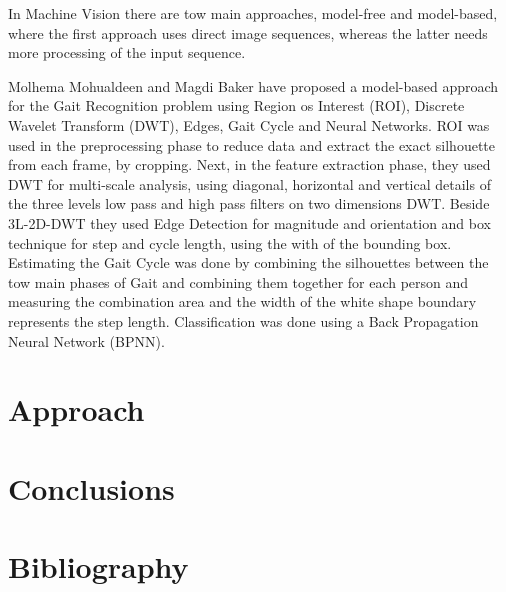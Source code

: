 \documentclass[12pt]{article}
\theoremstyle{definition}
\begin{document}
	In Machine Vision there are tow main approaches, model-free and model-based, where the first approach uses direct image sequences, whereas the latter needs more processing of the input sequence.
	
	Molhema Mohualdeen and Magdi Baker \cite{gait-silhouette-nn} have proposed a model-based approach for the Gait Recognition problem using Region os Interest (ROI), Discrete Wavelet Transform (DWT), Edges, Gait Cycle and Neural Networks.
	ROI was used in the preprocessing phase to reduce data and extract the exact silhouette from each frame, by cropping. Next, in the feature extraction phase, they used DWT for multi-scale analysis, using diagonal, horizontal and vertical details of the three levels low pass and high pass filters on two dimensions DWT. Beside 3L-2D-DWT they used Edge Detection for magnitude and orientation and box technique for step and cycle length, using the with of the bounding box. Estimating the Gait Cycle was done by combining the silhouettes between the tow main phases of Gait and combining them together for each person and measuring the combination area and the width of the white shape boundary represents the step length. Classification was done using a Back Propagation Neural Network (BPNN).
	
	\newpage
	
	\section{Approach}
	\vspace{1cm}
	
	\newpage
	
	\section{Conclusions}
	\vspace{1cm}
	
	\newpage
	
	\section{Bibliography}
	
	
	
\end{document}
